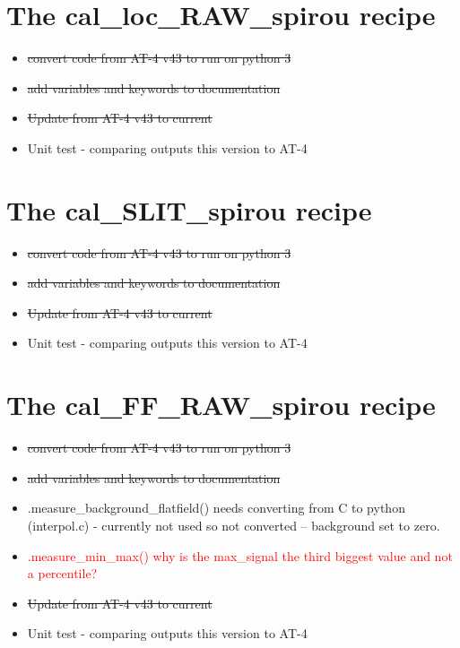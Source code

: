 \section{The cal\_loc\_RAW\_spirou recipe}
\label{ch:todo:cal_loc_RAW_spirou}

\begin{itemize}
	\item \sout{convert code from AT-4 v43 to run on python 3}
	\item \sout{add variables and keywords to documentation}
	\item \sout{Update from AT-4 v43 to current}
	\item Unit test - comparing outputs this version to AT-4
\end{itemize}

\section{The cal\_SLIT\_spirou recipe}
\label{ch:todo:cal_SLIT_spirou}

\begin{itemize}
	\item \sout{convert code from AT-4 v43 to run on python 3}
	\item \sout{add variables and keywords to documentation}
	\item \sout{Update from AT-4 v43 to current}
	\item Unit test - comparing outputs this version to AT-4
\end{itemize}

\section{The cal\_FF\_RAW\_spirou recipe}
\label{ch:todo:cal_FF_RAW_spirou}

\begin{itemize}
	\item \sout{convert code from AT-4 v43 to run on python 3}
	\item \sout{add variables and keywords to documentation}
	\item \spirouBACK.measure\_background\_flatfield() needs converting from C to python (interpol.c) - currently not used so not converted  -- background set to zero.
	\item \textcolor{red}{\spirouBACK.measure\_min\_max() why is the max\_signal the third biggest value and not a percentile?}
	\item \sout{Update from AT-4 v43 to current}
	\item Unit test - comparing outputs this version to AT-4
\end{itemize}

